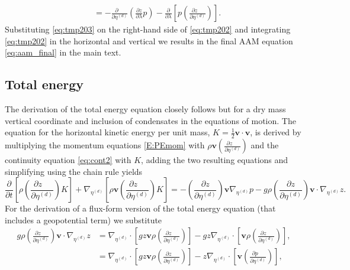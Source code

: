 \documentclass{agujournal}
\begin{document}
{\begin{align}
&=-\frac{\partial \quad}{\partial \eta^{(d)}}\left( \frac{\partial z}{\partial \lambda}p\right)-\frac{\partial }{\partial \lambda}\left[ p\left( \frac{\partial z\quad }{\partial \eta^{(d)}}\right)\right].\label{eq:tmp203}
\end{align}
Substituting \eqref{eq:tmp203} on the right-hand side of \eqref{eq:tmp202} and integrating \eqref{eq:tmp202} in the horizontal and vertical we results in the final AAM equation \eqref{eq:aam_final} in the main text.
\subsection{Total energy}
The derivation of the total energy equation closely follows \citet{K1974MWR} but for a dry mass vertical coordinate and inclusion of condensates in the equations of motion. The equation for the horizontal kinetic energy per unit mass, $K=\frac{1}{2}\mathbf{v}\cdot \mathbf{v}$, is derived by multiplying the momentum equations \eqref{E:PEmom} with $\rho \mathbf{v} \left( \frac{\partial z\quad }{\partial \eta^{(d)}}\right)$ and the continuity equation \eqref{eq:cont2} with $K$, adding the two resulting equations and simplifying using the chain rule yields
\begin{equation}
\frac{\partial }{\partial t}\left[ \rho \left( \frac{\partial z\quad }{\partial \eta^{(d)}}\right)K\right]+\nabla_{\eta^{(d)}} \left[ \rho \mathbf{v} \left( \frac{\partial z\quad }{\partial \eta^{(d)}}\right)K\right]=-\left( \frac{\partial z}{\partial \eta^{(d)}}\right)\mathbf{v} \nabla_{\eta^{(d)}}p-g\rho \left( \frac{\partial z}{\partial \eta^{(d)}}\right)\mathbf{v} \cdot \nabla_{\eta^{(d)}}z.\label{eq:K}
\end{equation}
For the derivation of a flux-form version of the total energy equation (that includes a geopotential term) we substitute
\begin{align}
g \rho \left( \frac{\partial z\quad }{\partial \eta^{(d)}}\right) \mathbf{v} \cdot \nabla_{\eta^{(d)}} z &= \nabla_{\eta^{(d)}}\cdot \left[ gz\mathbf{v}\rho  \left( \frac{\partial z\quad }{\partial \eta^{(d)}}\right) \right] - gz \nabla_{\eta^{(d)}} \cdot \left[ \mathbf{v}\rho  \left( \frac{\partial z\quad }{\partial \eta^{(d)}}\right) \right],\\
&=\nabla_{\eta^{(d)}}\cdot \left[ g z\mathbf{v}\rho  \left( \frac{\partial z\quad }{\partial \eta^{(d)}}\right) \right] -z \nabla_{\eta^{(d)}}\cdot \left[ \mathbf{v} \left( \frac{\partial p\quad }{\partial \eta^{(d)}}\right)\right],\label{eq:tmpK}
\end{align}
}
\end{document}
